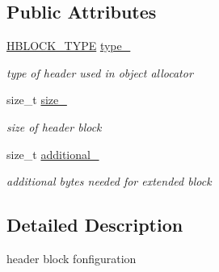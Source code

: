 \subsection*{Public Attributes}
\begin{DoxyCompactItemize}
\item 
\hypertarget{structOAConfig_1_1HeaderBlockInfo_a475b9a930ba8b63c1244ad7308467cfc}{\hyperlink{structOAConfig_a741c6dd161c0174180cc17f9a697b123}{H\-B\-L\-O\-C\-K\-\_\-\-T\-Y\-P\-E} \hyperlink{structOAConfig_1_1HeaderBlockInfo_a475b9a930ba8b63c1244ad7308467cfc}{type\-\_\-}}\label{structOAConfig_1_1HeaderBlockInfo_a475b9a930ba8b63c1244ad7308467cfc}

\begin{DoxyCompactList}\small\item\em type of header used in object allocator \end{DoxyCompactList}\item 
\hypertarget{structOAConfig_1_1HeaderBlockInfo_ac18553c734c873e7bc1efb0e4c62d3e8}{size\-\_\-t \hyperlink{structOAConfig_1_1HeaderBlockInfo_ac18553c734c873e7bc1efb0e4c62d3e8}{size\-\_\-}}\label{structOAConfig_1_1HeaderBlockInfo_ac18553c734c873e7bc1efb0e4c62d3e8}

\begin{DoxyCompactList}\small\item\em size of header block \end{DoxyCompactList}\item 
\hypertarget{structOAConfig_1_1HeaderBlockInfo_af99732e7667a763d1eeb454b3f15fb32}{size\-\_\-t \hyperlink{structOAConfig_1_1HeaderBlockInfo_af99732e7667a763d1eeb454b3f15fb32}{additional\-\_\-}}\label{structOAConfig_1_1HeaderBlockInfo_af99732e7667a763d1eeb454b3f15fb32}

\begin{DoxyCompactList}\small\item\em additional bytes needed for extended block \end{DoxyCompactList}\end{DoxyCompactItemize}


\subsection{Detailed Description}
header block fonfiguration 


